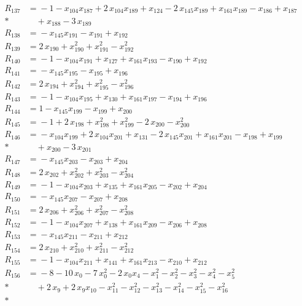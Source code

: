 \begin{align*}
R_{137} &={} -1 -x_{104} x_{187} +2\,x_{104} x_{189} +x_{124} -2\,x_{145} x_{189} +x_{161} x_{189} -x_{186} +x_{187} \\*
&\quad{} +x_{188} -3\,x_{189} \\[2pt]
R_{138} &={} -x_{145} x_{191} -x_{191} +x_{192} \\[2pt]
R_{139} &={} 2\,x_{190} +x_{190}^{2} +x_{191}^{2} -x_{192}^{2} \\[2pt]
R_{140} &={} -1 -x_{104} x_{191} +x_{127} +x_{161} x_{193} -x_{190} +x_{192} \\[2pt]
R_{141} &={} -x_{145} x_{195} -x_{195} +x_{196} \\[2pt]
R_{142} &={} 2\,x_{194} +x_{194}^{2} +x_{195}^{2} -x_{196}^{2} \\[2pt]
R_{143} &={} -1 -x_{104} x_{195} +x_{130} +x_{161} x_{197} -x_{194} +x_{196} \\[2pt]
R_{144} &={} 1 -x_{145} x_{199} -x_{199} +x_{200} \\[2pt]
R_{145} &={} -1 +2\,x_{198} +x_{198}^{2} +x_{199}^{2} -2\,x_{200} -x_{200}^{2} \\[2pt]
R_{146} &={} -x_{104} x_{199} +2\,x_{104} x_{201} +x_{131} -2\,x_{145} x_{201} +x_{161} x_{201} -x_{198} +x_{199} \\*
&\quad{} +x_{200} -3\,x_{201} \\[2pt]
R_{147} &={} -x_{145} x_{203} -x_{203} +x_{204} \\[2pt]
R_{148} &={} 2\,x_{202} +x_{202}^{2} +x_{203}^{2} -x_{204}^{2} \\[2pt]
R_{149} &={} -1 -x_{104} x_{203} +x_{135} +x_{161} x_{205} -x_{202} +x_{204} \\[2pt]
R_{150} &={} -x_{145} x_{207} -x_{207} +x_{208} \\[2pt]
R_{151} &={} 2\,x_{206} +x_{206}^{2} +x_{207}^{2} -x_{208}^{2} \\[2pt]
R_{152} &={} -1 -x_{104} x_{207} +x_{138} +x_{161} x_{209} -x_{206} +x_{208} \\[2pt]
R_{153} &={} -x_{145} x_{211} -x_{211} +x_{212} \\[2pt]
R_{154} &={} 2\,x_{210} +x_{210}^{2} +x_{211}^{2} -x_{212}^{2} \\[2pt]
R_{155} &={} -1 -x_{104} x_{211} +x_{141} +x_{161} x_{213} -x_{210} +x_{212} \\[2pt]
R_{156} &={} -8 -10\,x_{0} -7\,x_{0}^{2} -2\,x_{0} x_{4} -x_{1}^{2} -x_{2}^{2} -x_{3}^{2} -x_{4}^{2} -x_{5}^{2} \\*
&\quad{} +2\,x_{9} +2\,x_{9} x_{10} -x_{11}^{2} -x_{12}^{2} -x_{13}^{2} -x_{14}^{2} -x_{15}^{2} -x_{16}^{2} \\*

\end{align*}
